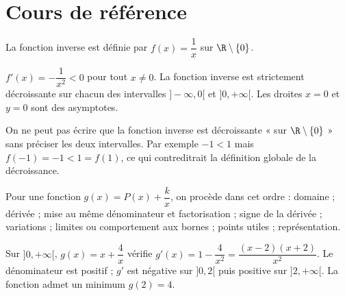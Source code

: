 
\section{Cours de référence}
La fonction inverse est définie par $f(x)=\dfrac1x$ sur $\R\setminus\{0\}$.

\begin{center}
\end{center}

\begin{keypoint}
$f'(x)=-\dfrac1{x^2}<0$ pour tout $x\neq0$. La fonction inverse est strictement décroissante sur chacun des intervalles $]-\infty,0[$ et $]0,+\infty[$. Les droites $x=0$ et $y=0$ sont des asymptotes.
\end{keypoint}

\begin{pitfall}
On ne peut pas écrire que la fonction inverse est décroissante « sur $\R\setminus\{0\}$ » sans préciser les deux intervalles. Par exemple $-1<1$ mais $f(-1)=-1<1=f(1)$, ce qui contreditrait la définition globale de la décroissance.
\end{pitfall}

Pour une fonction $g(x)=P(x)+\dfrac{k}{x}$, on procède dans cet ordre : domaine ; dérivée ; mise au même dénominateur et factorisation ; signe de la dérivée ; variations ; limites ou comportement aux bornes ; points utiles ; représentation.

\begin{example}
Sur $]0,+\infty[$, $g(x)=x+\dfrac4x$ vérifie $g'(x)=1-\dfrac4{x^2}=\dfrac{(x-2)(x+2)}{x^2}$. Le dénominateur est positif ; $g'$ est négative sur $]0,2[$ puis positive sur $]2,+\infty[$. La fonction admet un minimum $g(2)=4$.
\end{example}

